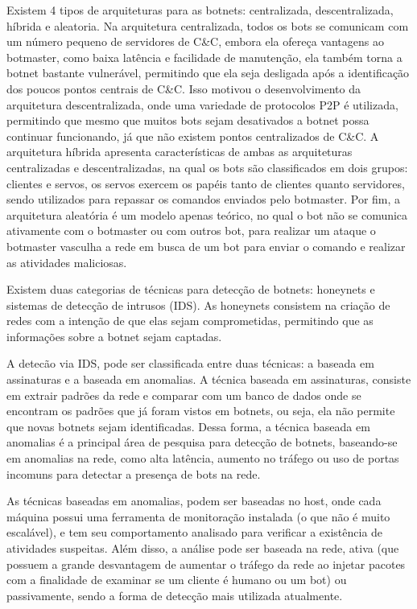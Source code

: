  Existem 4 tipos de arquiteturas para as botnets: centralizada, descentralizada, híbrida e aleatoria. Na arquitetura centralizada, todos os bots se comunicam com um número pequeno de servidores de C\&C, embora ela ofereça vantagens ao botmaster, como baixa latência e facilidade de manutenção, ela também torna a botnet bastante vulnerável, permitindo que ela seja desligada após a identificação dos poucos pontos centrais de C\&C. Isso motivou o desenvolvimento da arquitetura descentralizada, onde uma variedade de protocolos P2P é utilizada, permitindo que mesmo que muitos bots sejam desativados a botnet possa continuar funcionando, já que não existem pontos centralizados de C\&C. A arquitetura híbrida apresenta características de ambas as arquiteturas centralizadas e descentralizadas, na qual os bots são classificados em dois grupos: clientes e servos, os servos exercem os papéis tanto de clientes quanto servidores, sendo utilizados para repassar os comandos enviados pelo botmaster. Por fim, a arquitetura aleatória é um modelo apenas teórico, no qual o bot não se comunica ativamente com o botmaster ou com outros bot, para realizar um ataque o botmaster vasculha a rede em busca de um bot para enviar o comando e realizar as atividades maliciosas.

Existem duas categorias de técnicas para detecção de botnets: honeynets e sistemas de detecção de intrusos (IDS). As honeynets consistem na criação de redes com a intenção de que elas sejam comprometidas, permitindo que as informações sobre a botnet sejam captadas.

A detecão via IDS, pode ser classificada entre duas técnicas: a baseada em assinaturas e a baseada em anomalias. A técnica baseada em assinaturas, consiste em extrair padrões da rede e comparar com um banco de dados onde se encontram os padrões que já foram vistos em botnets, ou seja, ela não permite que novas botnets sejam identificadas. Dessa forma, a técnica baseada em anomalias é a principal área de pesquisa para detecção de botnets, baseando-se em anomalias na rede, como alta latência, aumento no tráfego ou uso de portas incomuns para detectar a presença de bots na rede.

As técnicas baseadas em anomalias, podem ser baseadas no host, onde cada máquina possui uma ferramenta de monitoração instalada (o que não é muito escalável), e tem seu comportamento analisado para verificar a existência de atividades suspeitas. Além disso, a análise pode ser baseada na rede, ativa (que possuem a grande desvantagem de aumentar o tráfego da rede ao injetar pacotes com a finalidade de examinar se um cliente é humano ou um bot) ou passivamente, sendo a forma de detecção mais utilizada atualmente.

